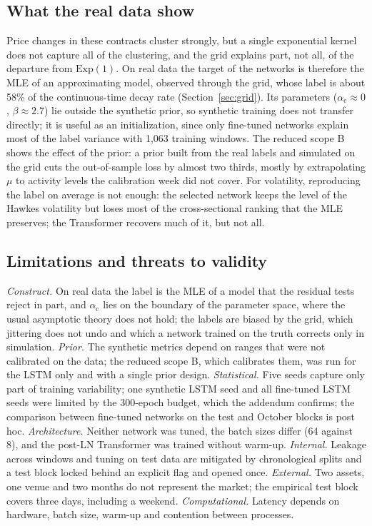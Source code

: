 \documentclass[preprint,12pt,authoryear]{elsarticle}
\newcommand{\across}{\alpha_{\mathrm{c}}}
\begin{document}
\subsection{What the real data show}

Price changes in these contracts cluster strongly, but a single
exponential kernel does not capture all of the clustering, and the grid explains part, not all, of the
departure from $\mathrm{Exp}(1)$. On real data the target of the networks is therefore the
MLE of an approximating model, observed through the grid, whose label is about 58\% of the
continuous-time decay rate (Section~\ref{sec:grid}). Its parameters ($\across\approx0$, $\beta\approx2.7$) lie
outside the synthetic prior, so synthetic training does not transfer directly; it is useful
as an initialization, since only fine-tuned networks explain most of the label variance with
1,063 training windows. The reduced scope B shows the effect of the prior: a prior
built from the real labels and simulated on the grid cuts the out-of-sample loss by almost
two thirds, mostly by extrapolating $\mu$ to activity levels the calibration week did not
cover. For volatility, reproducing the label on average is not enough: the selected network
keeps the level of the Hawkes volatility but loses most of the cross-sectional ranking that
the MLE preserves; the Transformer recovers much of it, but not all.

\subsection{Limitations and threats to validity}

\emph{Construct.} On real data the label is the MLE of a model that the residual tests reject
in part, and $\across$ lies on the boundary of the parameter space, where the usual asymptotic
theory does not hold; the labels are biased by the grid, which jittering does not undo and which a network
trained on the truth corrects only in simulation.
\emph{Prior.} The synthetic metrics depend on ranges that were not
calibrated on the data; the reduced scope B, which calibrates them, was run for the LSTM only
and with a single prior design. \emph{Statistical.} Five seeds capture only part of training
variability; one synthetic LSTM seed and all fine-tuned LSTM seeds were limited by the
300-epoch budget, which the addendum confirms; the comparison between fine-tuned networks on the test and October blocks
is post hoc. \emph{Architecture.} Neither network was tuned, the batch sizes differ (64
against 8), and the post-LN Transformer was trained without warm-up. \emph{Internal.} Leakage
across windows and tuning on test data are mitigated by chronological splits and a test
block locked behind an explicit flag and opened once. \emph{External.} Two assets, one venue
and two months do not represent the market; the empirical test block covers three days,
including a weekend. \emph{Computational.} Latency depends on hardware, batch size, warm-up
and contention between processes.
\end{document}
